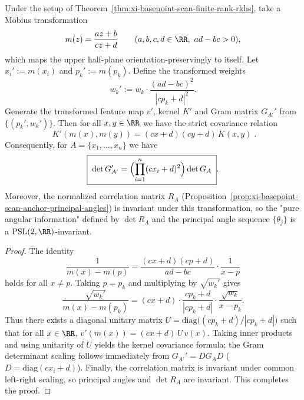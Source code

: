 \begin{proposition}\label{prop:xi-basepoint-scan-psl2r-covariance}
Under the setup of Theorem~\ref{thm:xi-basepoint-scan-finite-rank-rkhs}, take a Möbius transformation
\[
m(z)=\frac{az+b}{cz+d}\qquad(a,b,c,d\in\RR,\ ad-bc>0),
\]
which maps the upper half-plane orientation-preservingly to itself.
Let \(x_i':=m(x_i)\) and \(p_k':=m(p_k)\).
Define the transformed weights
\[
w_k':=w_k\cdot\frac{(ad-bc)^2}{|cp_k+d|^2}.
\]
Generate the transformed feature map \(v'\), kernel \(K'\) and Gram matrix \(G_{A'}'\) from \(\{(p_k',w_k')\}\).
Then for all \(x,y\in\RR\) we have the strict covariance relation
\[
\boxed{\;
K'(m(x),m(y))=(cx+d)(cy+d)\,K(x,y)\; }.
\]
Consequently, for \(A=\{x_1,\dots,x_n\}\) we have
\[
\boxed{\;
\det G_{A'}'=\Bigl(\prod_{i=1}^{n}(cx_i+d)^2\Bigr)\det G_A\; }.
\]
Moreover, the normalized correlation matrix \(R_A\) (Proposition~\ref{prop:xi-basepoint-scan-anchor-principal-angles}) is invariant under this transformation, so the "pure angular information" defined by \(\det R_A\) and the principal angle sequence \(\{\theta_j\}\) is a \(\mathrm{PSL}(2,\RR)\)-invariant.
\end{proposition}
\begin{proof}
The identity
\[
\frac{1}{m(x)-m(p)}=\frac{(cx+d)(cp+d)}{ad-bc}\cdot\frac{1}{x-p}
\]
holds for all \(x\neq p\).
Taking \(p=p_k\) and multiplying by \(\sqrt{w_k'}\) gives
\[
\frac{\sqrt{w_k'}}{m(x)-m(p_k)}
=(cx+d)\cdot \frac{cp_k+d}{|cp_k+d|}\cdot \frac{\sqrt{w_k}}{x-p_k}.
\]
Thus there exists a diagonal unitary matrix \(U=\mathrm{diag}\bigl((cp_k+d)/|cp_k+d|\bigr)\) such that for all \(x\in\RR\),
\(
v'(m(x))=(cx+d)\,U\,v(x)
\).
Taking inner products and using unitarity of \(U\) yields the kernel covariance formula; the Gram determinant scaling follows immediately from \(G_{A'}'=D G_A D\) (\(D=\mathrm{diag}(cx_i+d)\)).
Finally, the correlation matrix is invariant under common left-right scaling, so principal angles and \(\det R_A\) are invariant. This completes the proof.
\end{proof}

